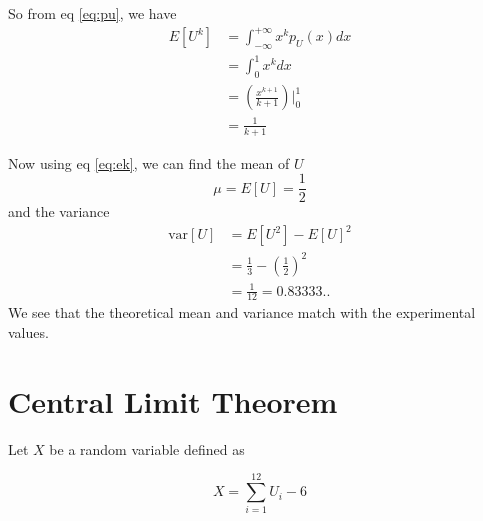 \documentclass[journal, 12pt, twocolumn]{IEEEtran}
\begin{document}
\begin{enumerate}[label=\arabic{section}.\arabic*]
        So from eq \eqref{eq:pu}, we have
        \begin{align}
            E\left[U^k\right] &= \int_{-\infty}^{+\infty}{x^k p_U(x) dx} \\
            &= \int_{0}^{1}{x^k dx} \\
            &= \left(\frac{x^{k+1}}{k+1}\right)\Big|_0^1 \\
            &= \frac{1}{k+1} \label{eq:ek}
        \end{align}

        Now using eq \eqref{eq:ek}, we can find the mean of $U$
        \begin{equation}
            \mu = E\left[U\right] = \frac{1}{2}
        \end{equation}
        and the variance
        \begin{align}
            \text{var}\left[U\right] &= E\left[U^2\right] - E\left[U\right]^2 \\
            &= \frac{1}{3} - \left(\frac{1}{2}\right)^2 \\
            &= \frac{1}{12} = 0.83333..
        \end{align}
        We see that the theoretical mean and variance match with the experimental values.

\end{enumerate}

\section{Central Limit Theorem}

Let $X$ be a random variable defined as

\begin{equation}
    X = \sum_{i=1}^{12}{U_i - 6}
\end{equation}
\end{document}
